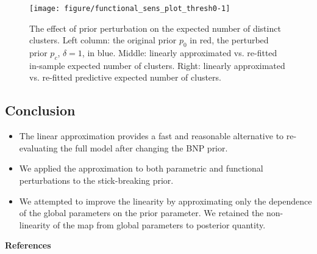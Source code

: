 \documentclass[a0,plainsections]{sciposter}\usepackage[]{graphicx}\usepackage[]{color}
\newenvironment{knitrout}{}{} %
\begin{document}
\begin{minipage}[t]{0.45\textwidth}
\begin{figure}
\begin{knitrout}
\color{fgcolor}

{\centering \texttt{[image: figure/functional\_sens\_plot\_thresh0-1]} 

}



\end{knitrout}
\caption{The effect of prior perturbation on the expected number of distinct clusters. Left column: the original prior $p_0$ in red, the perturbed prior $p_c$, $\delta = 1$, in blue. Middle: linearly approximated vs.
re-fitted in-sample expected number of clusters. Right: linearly approximated vs. re-fitted predictive expected number of clusters.}
\end{figure}

\vspace{0.3in}
\begin{mdframed}[style=MyFrame]
\vspace{-0.6in}
\section*{Conclusion}
\vspace{-0.3in}

\begin{itemize}

\item The linear approximation provides a fast and reasonable alternative to re-evaluating the full model after changing the BNP prior. 

\item We applied the approximation to both parametric and functional perturbations to the stick-breaking prior.

\item We attempted to improve the linearity by approximating only the dependence of the global parameters on the prior parameter. We retained the non-linearity of the map from global parameters to posterior quantity. 

\end{itemize}
\end{mdframed}

\vspace{0.9in}
{\bf References}
\renewcommand{\section}[2]{}%
\small{
  
  
}
% 


\end{minipage}\\
\end{document}
